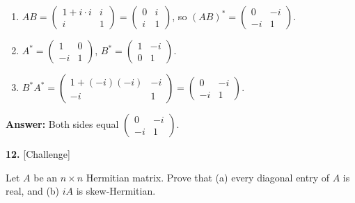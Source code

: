 \documentclass[11pt]{article}
\begin{document}
\begin{tcolorbox}[breakable,colback=ans,colframe=ansb,boxrule=0.5pt,left=4pt,right=4pt,top=2pt,bottom=2pt]\begin{enumerate}[leftmargin=2.2em,itemsep=1pt,topsep=1pt,label=\textbf{Step \arabic*.}]\item $AB=\begin{pmatrix}1+i\cdot i&i\\i&1\end{pmatrix}=\begin{pmatrix}0&i\\i&1\end{pmatrix}$, so $(AB)^{*}=\begin{pmatrix}0&-i\\-i&1\end{pmatrix}$.
\item $A^{*}=\begin{pmatrix}1&0\\-i&1\end{pmatrix}$, \quad $B^{*}=\begin{pmatrix}1&-i\\0&1\end{pmatrix}$.
\item $B^{*}A^{*}=\begin{pmatrix}1+(-i)(-i)&-i\\-i&1\end{pmatrix}=\begin{pmatrix}0&-i\\-i&1\end{pmatrix}$.
\end{enumerate}\textbf{Answer:} Both sides equal $\begin{pmatrix}0&-i\\-i&1\end{pmatrix}$.\end{tcolorbox}
\par\vspace{2pt}
\begin{minipage}{\linewidth}\textbf{12.} \hfill{\scriptsize\color{ink}[Challenge]}\par\nopagebreak Let $A$ be an $n\times n$ Hermitian matrix. Prove that (a) every diagonal entry of $A$ is real, and (b) $iA$ is skew-Hermitian.
\end{minipage}\par\nopagebreak
\end{document}
